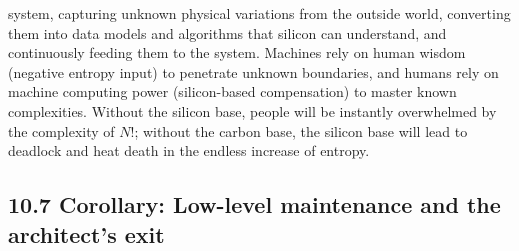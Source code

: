\documentclass[11pt,a4paper]{article}
\begin{document}
system, capturing unknown physical variations from the outside world, converting them into data models and algorithms that silicon can understand, and continuously feeding them to the system. Machines rely on human wisdom (negative entropy input) to penetrate unknown boundaries, and humans rely on machine computing power (silicon-based compensation) to master known complexities. Without the silicon base, people will be instantly overwhelmed by the complexity of $N!$; without the carbon base, the silicon base will lead to deadlock and heat death in the endless increase of entropy.


\subsection*{10.7 Corollary: Low-level maintenance and the architect’s exit}
\end{document}
